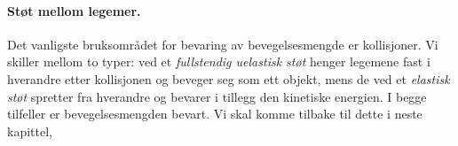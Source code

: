 
\paragraph*{Støt mellom legemer.}
Det vanligste bruksområdet for bevaring av bevegelsesmengde er kollisjoner. Vi skiller mellom to typer: ved et \textit{fullstendig uelastisk støt} henger legemene fast i hverandre etter kollisjonen og beveger seg som ett objekt, mens de ved et \textit{elastisk støt} spretter fra hverandre og bevarer i tillegg den kinetiske energien. I begge tilfeller er bevegelsesmengden bevart. Vi skal komme tilbake til dette i neste kapittel, 


